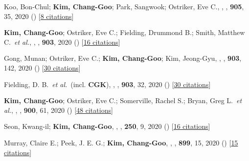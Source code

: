 \item[{29.}]Koo, Bon-Chul; \textbf{Kim, Chang-Goo}; Park, Sangwook; Ostriker, Eve C., , \apj, \textbf{905}, 35, 2020 () [\href{http://adsabs.harvard.edu/abs/2020ApJ...905...35K}{8 citations}]

\item[{28.}]\textbf{Kim, Chang-Goo}; Ostriker, Eve C.; Fielding, Drummond B.; Smith, Matthew C.~\textit{et al.}, , \apj, \textbf{903}, 2020 () [\href{http://adsabs.harvard.edu/abs/2020ApJ...903L..34K}{16 citations}]

\item[{27.}]Gong, Munan; Ostriker, Eve C.; \textbf{Kim, Chang-Goo}; Kim, Jeong-Gyu, , \apj, \textbf{903}, 142, 2020 () [\href{http://adsabs.harvard.edu/abs/2020ApJ...903..142G}{30 citations}]

\item[{26.}]Fielding, D. B.~\textit{et al.}~(incl. \textbf{CGK}), , \apj, \textbf{903}, 32, 2020 () [\href{http://adsabs.harvard.edu/abs/2020ApJ...903...32F}{30 citations}]

\item[{25.}]\textbf{Kim, Chang-Goo}; Ostriker, Eve C.; Somerville, Rachel S.; Bryan, Greg L.~\textit{et al.}, , \apj, \textbf{900}, 61, 2020 () [\href{http://adsabs.harvard.edu/abs/2020ApJ...900...61K}{48 citations}]

\item[{24.}]Seon, Kwang-il; \textbf{Kim, Chang-Goo}, , \apjs, \textbf{250}, 9, 2020 () [\href{http://adsabs.harvard.edu/abs/2020ApJS..250....9S}{16 citations}]

\item[{23.}]Murray, Claire E.; Peek, J. E. G.; \textbf{Kim, Chang-Goo}, , \apj, \textbf{899}, 15, 2020 () [\href{http://adsabs.harvard.edu/abs/2020ApJ...899...15M}{15 citations}]


